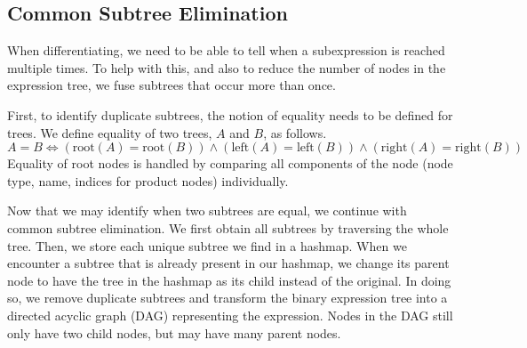 \documentclass[12pt, a4paper]{report}
\begin{document}
\subsection{Common Subtree Elimination}
When differentiating, we need to be able to tell when a subexpression is reached multiple times.
To help with this, and also to reduce the number of nodes in the expression tree, we fuse subtrees that occur more than once.

First, to identify duplicate subtrees, the notion of equality needs to be defined for trees.
We define equality of two trees, $A$ and $B$, as follows.
$$
A = B \iff (\text{root}(A) = \text{root}(B)) \land (\text{left}(A) = \text{left}(B)) \land (\text{right}(A) = \text{right}(B))
$$
Equality of root nodes is handled by comparing all components of the node (node type, name, indices for product nodes) individually.

Now that we may identify when two subtrees are equal, we continue with common subtree elimination.
We first obtain all subtrees by traversing the whole tree.
Then, we store each unique subtree we find in a hashmap.
When we encounter a subtree that is already present in our hashmap, we change its parent node to have the tree in the hashmap as its child instead of the original.
In doing so, we remove duplicate subtrees and transform the binary expression tree into a directed acyclic graph (DAG) representing the expression.
Nodes in the DAG still only have two child nodes, but may have many parent nodes.
\end{document}
